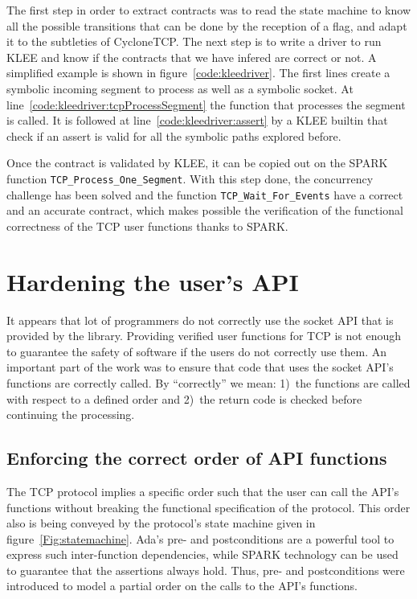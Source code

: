 \documentclass[conference]{IEEEtran}
\def\spark#1{\lstinline[language=Ada]{#1}}
\begin{document}
The first step in order to extract contracts was to read the state machine to
know all the possible transitions that can be done by the reception of a flag,
and adapt it to
the subtleties of CycloneTCP. The next step is to write a driver to run KLEE and
know if the contracts that we have infered are correct or not.
A simplified example is shown in figure~\ref{code:kleedriver}. The first lines
create a symbolic incoming segment to process as well as a symbolic socket.
At line~\ref{code:kleedriver:tcpProcessSegment} the function that processes the
segment is called. It is followed at line~\ref{code:kleedriver:assert} by a KLEE
builtin that check if an assert is valid for all the symbolic paths
explored before.

Once the contract is validated by KLEE, it can be copied out on the SPARK
function \spark{TCP_Process_One_Segment}. With this step done, the concurrency
challenge has been solved and the function
\spark{TCP_Wait_For_Events} have a correct and an accurate contract, which
makes possible the verification of the functional correctness of the TCP user
functions thanks to SPARK.



\section{Hardening the user's API}
\label{sec:API}

It appears that lot of programmers do not correctly use the socket API that is
provided by the library. Providing verified user functions for TCP is not enough
to guarantee the safety of software if the users do not correctly use them.
An important part of the work was to ensure that code that uses the socket API's
functions are correctly called. By ``correctly'' we mean: 1)~the functions
are called with respect to a defined order and 2)~the return code is checked
before continuing the processing.

\subsection{Enforcing the correct order of API functions}

The TCP protocol implies a specific order such that the user can call the API's
functions without breaking the functional specification of the protocol. This
order also is being conveyed by the protocol's state machine given in
figure~\ref{Fig:statemachine}.
Ada's pre- and postconditions are a powerful tool to express such inter-function
dependencies, while SPARK technology can be used to guarantee that the
assertions always hold. Thus, pre- and postconditions were introduced to model
a partial order on the calls to the API's functions.
\end{document}
